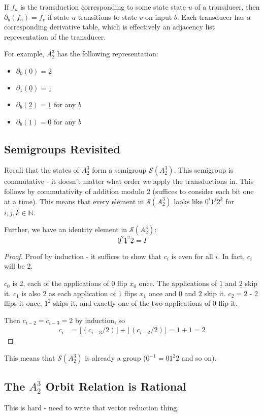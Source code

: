 \documentclass{article}
\newcommand{\0}{\underline{0}}
\newcommand{\1}{\underline{1}}
\newcommand{\2}{\underline{2}}
\newcommand{\N}{\mathbb{N}}
\renewcommand{\S}{\mathcal{S}}
\begin{document}
If $f_u$ is the transduction corresponding to some state state $u$ of a transducer, then $\partial_b(f_u) = f_v$ if state $u$ transitions to state $v$ on input $b$. Each transducer has a corresponding derivative table, which is effectively an adjacency list representation of the transducer.

For example, $A^3_2$ has the following representation:

\begin{itemize}
\item $\partial_0(\0) = \2$
\item $\partial_1(\0) = \1$
\item $\partial_b(\2) = \1$ for any $b$
\item $\partial_b(\1) = \0$ for any $b$
\end{itemize}

\subsection*{Semigroups Revisited}
Recall that the states of $A^3_2$ form a semigroup $\S(A^3_2)$. This semigroup is commutative - it doesn't matter what order we apply the transductions in. This follows by commutativity of addition modulo 2 (suffices to consider each bit one at a time). This means that every element in $\S(A^3_2)$ looks like $\0^i \1^j\2^k$ for $i, j, k \in \N$.

Further, we have an identity element in $\S(A^3_2)$: $$\0^2\1^2\2 = I$$
\begin{proof}
Proof by induction - it suffices to show that $c_i$ is even for all $i$. In fact, $c_i$ will be 2.

$c_0$ is 2, each of the applications of $\0$ flip $x_0$ once. The applications of $\1$ and $\2$ skip it. $c_1$ is also 2 as each application of $\1$ flips $x_1$ once and $\0$ and $\2$ skip it. $c_2 = 2$ - $\2$ flips it once, $\1^2$ skips it, and exactly one of the two applications of $\0$ flip it.

Then $c_{i-2} = c_{i-3} = 2$ by induction, so
\begin{align*}
c_i &= \lfloor (c_{i-3} / 2) \rfloor + \lfloor (c_{i-2} / 2) \rfloor = 1 + 1 = 2
\end{align*}
\end{proof}
This means that $\S(A^3_2)$ is already a group ($\0^{-1} = \0\1^2\2$ and so on).

\subsection*{The $A^3_2$ Orbit Relation is Rational}
This is hard - need to write that vector reduction thing.
\end{document}
